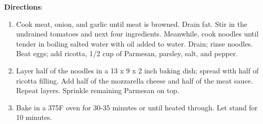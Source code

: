 \documentclass[11pt, twoside, openany]{book}
\begin{document}
\begin{minipage}[t]{\linewidth}
\begin{minipage}[t]{0.18\linewidth}
\end{minipage}\vspace{3mm}
\textbf{Directions}:
\vspace{-3mm}\begin{enumerate}\setlength\itemsep{-1mm}
\item Cook meat, onion, and garlic until meat is browned. Drain fat. Stir in the undrained tomatoes and next four ingredients. Meanwhile, cook noodles until tender in boiling salted water with oil added to water. Drain; rinse noodles. Beat eggs; add ricotta, 1/2 cup of Parmesan, parsley, salt, and pepper.
\item Layer half of the noodles in a 13 x 9 x 2 inch baking dish; spread with half of ricotta filling. Add half of the mozzarella cheese and half of the meat sauce. Repeat layers. Sprinkle remaining Parmesan on top.
\item Bake in a 375F oven for 30-35 minutes or until heated through. Let stand for 10 minutes.
\end{enumerate}
\end{minipage}\vspace{8mm}
\end{document}
